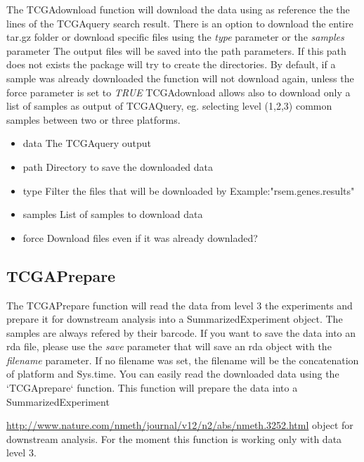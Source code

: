The TCGAdownload function will download the data using as reference the the lines of the TCGAquery search result. 
There is an option to download the entire tar.gz folder or download specific files using the \emph{type} parameter or the \emph{samples} parameter
The output files will be saved into the path parameters. If this path does not exists the package will try to create the directories. By default, if a sample was already downloaded the function will not download again, unless the force parameter is set to \emph{TRUE}
TCGAdownload allows also to download only a list of samples as output of TCGAQuery, eg. selecting level (1,2,3) common samples between two or three platforms. 

\begin{tiny}
\begin{itemize}[nolistsep]
\item data The TCGAquery output
\item path Directory to save the downloaded data
\item type Filter the files that will be downloaded by Example:"rsem.genes.results"
\item samples List of samples to download data
\item force Download files even if it was already downladed?
\end{itemize}
\end{tiny}

\subsection{TCGAPrepare}
The TCGAPrepare function will read the data from level 3 the experiments and prepare it for downstream analysis into a SummarizedExperiment object. The samples are always refered by their barcode. If you want to save the data into an rda file, please use the \emph{save}
parameter that will save an rda object with the  \emph{filename} parameter.
If no filename was set, the filename will be the concatenation of platform and Sys.time.
You can easily read the downloaded data using the `TCGAprepare` function.
This function will prepare the data into a SummarizedExperiment

\url{http://www.nature.com/nmeth/journal/v12/n2/abs/nmeth.3252.html}
object for downstream analysis. 
For the moment this function is working only with data level 3.

